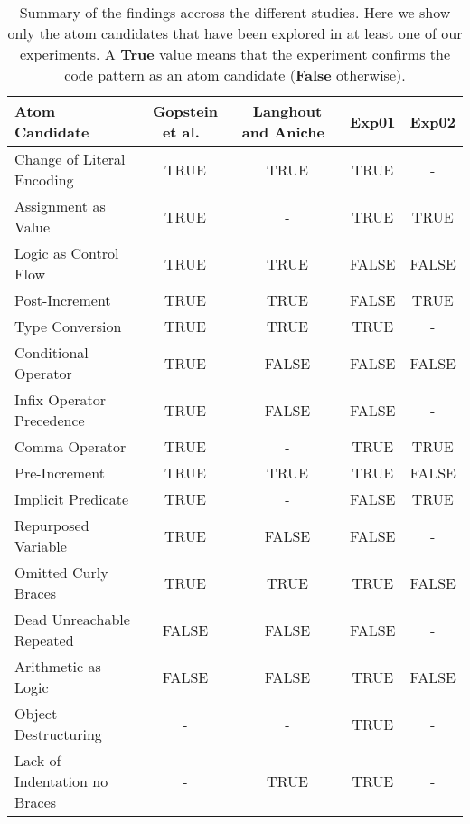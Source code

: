 \begin{table}[htb]
  \caption{Summary of the findings accross the different studies. Here we show 
    only the atom candidates that have been explored in at least one
    of our experiments. A {\bf True} value means that the experiment
    confirms the code pattern as an atom candidate ({\bf False} otherwise).}
  \label{tab:summary-of-findings}
\begin{scriptsize}
\begin{tabular}{lcccc}\toprule 
Atom Candidate	                 & Gopstein et al.~\cite{DBLP:conf/sigsoft/GopsteinIYDZYC17} & Langhout and Aniche~\cite{Langhout:2021:ACJ}  & Exp01     &  Exp02   \\ \midrule

Change of Literal Encoding       &   TRUE   &   TRUE   &   TRUE    &   -      \\
Assignment as Value              &   TRUE   &   -      &   TRUE    &   TRUE   \\
Logic as Control Flow            &   TRUE   &   TRUE   &   FALSE   &   FALSE  \\
Post-Increment                   &   TRUE   &   TRUE   &   FALSE   &   TRUE   \\
Type Conversion                  &   TRUE   &   TRUE   &   TRUE    &   -      \\
Conditional Operator             &   TRUE   &   FALSE  &   FALSE   &   FALSE  \\
Infix Operator Precedence        &   TRUE   &   FALSE  &   FALSE   &   -      \\
Comma Operator                   &   TRUE   &   -      &   TRUE    &   TRUE   \\
Pre-Increment                    &   TRUE   &   TRUE   &   TRUE    &   FALSE  \\
Implicit Predicate               &   TRUE   &   -      &   FALSE   &   TRUE   \\
Repurposed Variable              &   TRUE   &   FALSE  &   FALSE   &   -      \\ 
Omitted Curly Braces             &   TRUE   &   TRUE   &   TRUE    &   FALSE  \\
Dead Unreachable Repeated        &   FALSE  &   FALSE  &   FALSE   &   -      \\
Arithmetic as Logic              &   FALSE  &   FALSE  &   TRUE    &   FALSE  \\
Object Destructuring             &   -      &   -      &   TRUE    &   -      \\
Lack of Indentation no Braces    &   -      &   TRUE   &   TRUE    &   -      \\

\end{tabular}
\end{scriptsize}
\end{table}
